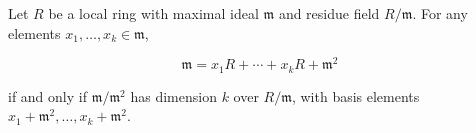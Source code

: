 Let $R$ be a local ring with maximal ideal $\mathfrak{m}$ and residue field $R/\mathfrak{m}$. For any elements $x_1, \ldots, x_k \in \mathfrak{m}$,

$$\mathfrak{m} = x_1 R + \cdots + x_k R + \mathfrak{m}^2$$

if and only if $\mathfrak{m}/\mathfrak{m}^2$ has dimension $k$ over $R/\mathfrak{m}$, with basis elements $x_1 + \mathfrak{m}^2, \ldots, x_k + \mathfrak{m}^2$.
